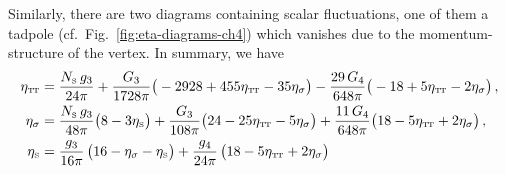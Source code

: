 \documentclass[11pt]{book} %
\newcommand\TTspace{ -1pt }
\newcommand\etaTT{ \eta_{\scriptscriptstyle{\mathrm{T\hspace{\TTspace}T}}} }
\newcommand\etaS{ \eta_{\scriptscriptstyle{\mathrm{S}}} }
\newcommand\NS{ N_{\scriptscriptstyle{\mathrm{S}}} }
\newcommand{\bea}{\begin{eqnarray}}
\newcommand{\eea}{\end{eqnarray}}
\numberwithin{equation}{chapter}
\begin{document}
Similarly, there are two diagrams containing scalar fluctuations,
one of them a tadpole (cf.~Fig.~\ref{fig:eta-diagrams-ch4}) which vanishes due to the
momentum-structure of the vertex.
In summary, we have
\begin{align}
  \etaTT      &= \frac{\NS \, g_3}{24 \pi} + \frac{G_3}{1728 \pi} \big( -2928 + 455 \etaTT - 35 \eta_\sigma \big)
  - \frac{29 \, G_4}{648 \pi} \big( -18 + 5 \etaTT - 2 \eta_\sigma \big) \,,
  \label{etaTTcomplete} \\
  \eta_\sigma &= \frac{\NS \, g_3}{48 \pi} \big( 8-3 \etaS \big) + \frac{G_3}{108 \pi} \big( 24 - 25\etaTT - 5 \eta_\sigma \big)
   +\frac{11 \, G_4}{648 \pi} \big( 18 - 5 \etaTT + 2 \eta_\sigma \big) \,,
  \label{etasigmacomplete} \\
  \etaS &= \frac{g_3}{16\pi} \, \big(16-\eta_{\sigma}-\etaS \big)
  + \frac{g_4}{24 \pi} \, \big( 18 - 5 \etaTT + 2 \eta_{\sigma} \big)
\end{align}
\end{document}
